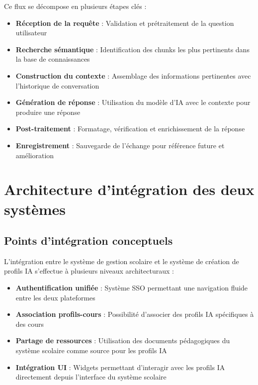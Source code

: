 Ce flux se décompose en plusieurs étapes clés :

\begin{itemize}
  \item \textbf{Réception de la requête} : Validation et prétraitement de la question utilisateur
  
  \item \textbf{Recherche sémantique} : Identification des chunks les plus pertinents dans la base de connaissances
  
  \item \textbf{Construction du contexte} : Assemblage des informations pertinentes avec l'historique de conversation
  
  \item \textbf{Génération de réponse} : Utilisation du modèle d'IA avec le contexte pour produire une réponse
  
  \item \textbf{Post-traitement} : Formatage, vérification et enrichissement de la réponse
  
  \item \textbf{Enregistrement} : Sauvegarde de l'échange pour référence future et amélioration
\end{itemize}

\section{Architecture d'intégration des deux systèmes}

\subsection{Points d'intégration conceptuels}

L'intégration entre le système de gestion scolaire et le système de création de profils IA s'effectue à plusieurs niveaux architecturaux :

\begin{itemize}
  \item \textbf{Authentification unifiée} : Système SSO permettant une navigation fluide entre les deux plateformes
  
  \item \textbf{Association profils-cours} : Possibilité d'associer des profils IA spécifiques à des cours
  
  \item \textbf{Partage de ressources} : Utilisation des documents pédagogiques du système scolaire comme source pour les profils IA
  
  \item \textbf{Intégration UI} : Widgets permettant d'interagir avec les profils IA directement depuis l'interface du système scolaire
\end{itemize}

